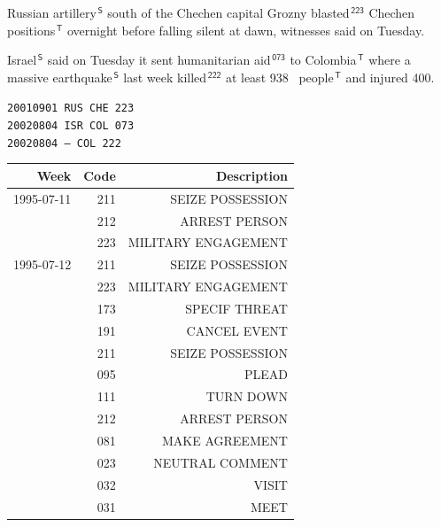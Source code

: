 \documentclass{mediumfoils}
\newcommand{\mkred}[1]{{\color{bloodred}#1}}
\newcommand{\mkblue}[1]{{\color{darkblue}#1}}
\newcommand{\mkgreen}[1]{{\color{darkgreen}#1}}
\begin{document}

                                                                                                                               
\mkred{Russian artillery}$^{\,\mathsf{S}}$ south of the Chechen
capital
Grozny \mkgreen{blasted}$^{\,\mathsf{223}}$ \mkblue{Chechen
positions}$^{\,\mathsf{T}}$ overnight before falling silent
at dawn, witnesses said on Tuesday.

\noindent                                                          
\mkred{Israel}$^{\,\mathsf{S}}$ said on Tuesday it \mkgreen{sent
  humanitarian aid}$^{\,\mathsf{073}}$ to
\mkblue{Colombia}$^{\,\mathsf{T}}$ where a \mkred{massive
  earthquake}$^{\,\mathsf{S}}$ last week
\mkgreen{killed}$^{\,\mathsf{222}}$ at least \mkblue{938~
people}$^{\,\mathsf{T}}$ and injured 400.
~\\
{\large
\begin{center}
\texttt{20010901 RUS CHE 223}\\
\texttt{20020804 ISR COL 073}\\
\texttt{20020804 --- COL 222}
\end{center}
}

\begin{center} 
{\footnotesize
\begin{tabular}{rrr} \toprule
Week       & Code & Description \\ \midrule
1995-07-11 & 211 & SEIZE POSSESSION \\
 & 212 & ARREST PERSON \\
 & 223 & MILITARY ENGAGEMENT \\ \midrule
1995-07-12 & 211 & SEIZE POSSESSION \\
 & 223 & MILITARY ENGAGEMENT \\
 & 173 & SPECIF THREAT \\
 & 191 & CANCEL EVENT \\
 & 211 & SEIZE POSSESSION \\
 & 095 & PLEAD \\
 & 111 & TURN DOWN \\
 & 212 & ARREST PERSON \\
 & 081 & MAKE AGREEMENT \\
 & 023 & NEUTRAL COMMENT \\
 & 032 & VISIT \\
 & 031 & MEET \\ \bottomrule
\end{tabular}
}
\end{center}
\end{document}
